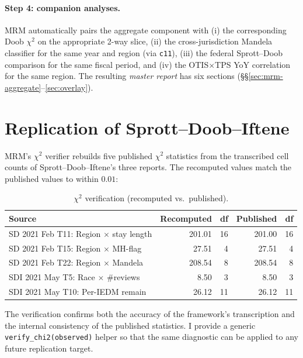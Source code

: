 \documentclass[11pt,a4paper]{article}
\theoremstyle{plain}
\theoremstyle{definition}
\theoremstyle{remark}
\begin{document}
\paragraph{Step 4: companion analyses.} MRM automatically pairs
the aggregate component with (i) the corresponding Doob
$\chi^{2}$ on the appropriate 2-way slice, (ii) the
cross-jurisdiction Mandela classifier for the same year and
region (via \texttt{c11}), (iii) the federal Sprott--Doob
comparison for the same fiscal period, and (iv) the
OTIS$\times$TPS YoY correlation for the same region. The
resulting \emph{master report} has six sections
(\S\S\ref{sec:mrm-aggregate}--\ref{sec:overlay}).

\section{Replication of Sprott--Doob--Iftene}
\label{sec:replication}

MRM's $\chi^{2}$ verifier rebuilds five published $\chi^{2}$
statistics from the transcribed cell counts of
Sprott--Doob--Iftene's three reports. The recomputed values
match the published values to within $0.01$:

\begin{table}[ht]
  \caption{$\chi^{2}$ verification (recomputed vs.\ published).}
  \label{tab:chi2-verify}
  \centering
  \begin{tabular}{lrrrr}
    \toprule
    Source                                      & Recomputed & df & Published & df \\
    \midrule
    SD 2021 Feb T11: Region $\times$ stay length & 201.01    & 16 & 201.00    & 16 \\
    SD 2021 Feb T15: Region $\times$ MH-flag    &  27.51    &  4 &  27.51    &  4 \\
    SD 2021 Feb T22: Region $\times$ Mandela    & 208.54    &  8 & 208.54    &  8 \\
    SDI 2021 May T5: Race $\times$ \#reviews    &   8.50    &  3 &   8.50    &  3 \\
    SDI 2021 May T10: Per-IEDM remain           &  26.12    & 11 &  26.12    & 11 \\
    \bottomrule
  \end{tabular}
\end{table}

The verification confirms both the accuracy of the framework's
transcription and the internal consistency of the published
statistics. I provide a generic
\texttt{verify\_chi2(observed)} helper so that the same diagnostic
can be applied to any future replication target.
\end{document}
